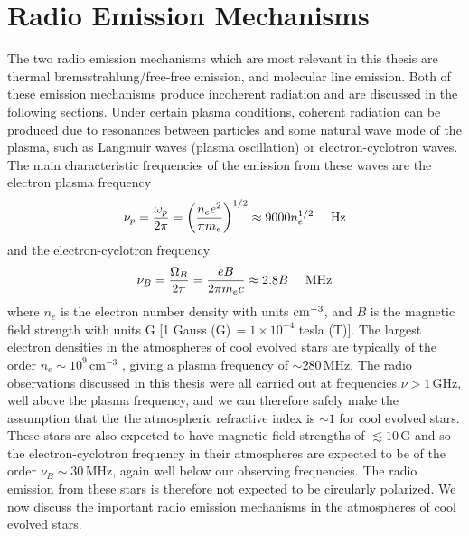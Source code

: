 \section{Radio Emission Mechanisms}\label{sec:1.7}
The two radio emission mechanisms which are most relevant in this thesis are thermal bremsstrahlung/free-free emission, and molecular line emission. Both of these emission mechanisms produce incoherent radiation and are discussed in the following sections. Under certain plasma conditions, coherent radiation can be produced due to resonances between particles and some natural wave mode of the plasma, such as Langmuir waves (plasma oscillation) or electron-cyclotron waves. The main characteristic frequencies of the emission from these waves are the electron plasma frequency
\begin{equation}
\nu _{p} = \frac{\omega _{p}}{2\pi}=\left( \frac{n_e e^2}{\pi m_e}\right)^{1/2} \approx 9000 n_e ^{1/2}\ \ \ \ \rm{Hz}
\end{equation}
and the electron-cyclotron frequency
\begin{equation}
\nu _{B}= \frac{\Omega _{B}}{2\pi}=\frac{eB}{2\pi m_e c} \approx 2.8B\ \ \ \ \rm{MHz}
\end{equation}
where $n_e$ is the electron number density with units $\rm{cm}^{-3}$, and $B$ is the magnetic field strength with units G [1 Gauss (G)\,$= 1\times 10^{-4}$ tesla (T)]. The largest electron densities in the atmospheres of cool evolved stars are typically of the order $n_{e} \sim 10^{9}$\,cm$^{-3}$ \citep{judge_1998}, giving a plasma frequency of $\sim 280$\,MHz. The radio observations discussed in this thesis were all carried out at frequencies $\nu > 1$\,GHz, well above the plasma frequency, and we can therefore safely make the assumption that the the atmospheric refractive index is $\sim 1$ for cool evolved stars. These stars are also expected to have magnetic field strengths of $\lesssim 10$\,G \cite[e.g.,][]{bedecarrax_2013,sennhauser_2011} and so the electron-cyclotron frequency in their atmospheres are expected to be of the order $\nu _{B} \sim 30$\,MHz, again well below our observing frequencies. The radio emission from these stars is therefore not expected to be circularly polarized. We now discuss the important radio emission mechanisms in the atmospheres of cool evolved stars.

